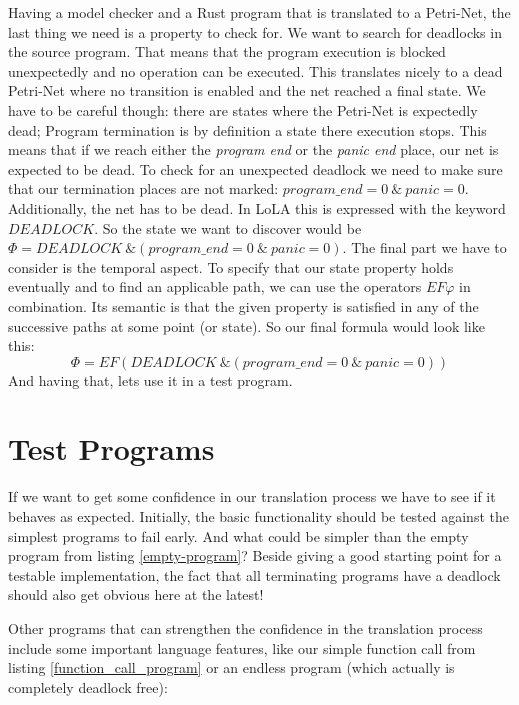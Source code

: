 Having a model checker and a Rust program that is translated to a Petri-Net, the last thing we need is a property to check for.
We want to search for deadlocks in the source program.
That means that the program execution is blocked unexpectedly and no operation can be executed.
This translates nicely to a dead Petri-Net where no transition is enabled and the net reached a final state.
We have to be careful though: there are states where the Petri-Net is expectedly dead;
Program termination is by definition a state there execution stops.
This means that if we reach either the \textit{program end} or the \textit{panic end} place, our net is expected to be dead.
To check for an unexpected deadlock we need to make sure that our termination places are not marked: $program\_end = 0\ \&\ panic = 0$.
Additionally, the net has to be dead.
In LoLA this is expressed with the keyword $DEADLOCK$.
So the state we want to discover would be $\Phi=DEADLOCK\ \& (program\_end = 0\ \&\ panic = 0)$.
The final part we have to consider is the temporal aspect.
To specify that our state property holds eventually and to find an applicable path, we can use the operators $EF\varphi$ in combination.
Its semantic is that the given property is satisfied in any of the successive paths at some point (or state).
So our final formula would look like this:
$$\Phi = EF(DEADLOCK\ \& (program\_end = 0\ \&\  panic = 0))$$
And having that, lets use it in a test program.

\section{Test Programs}
\label{app_test}
If we want to get some confidence in our translation process we have to see if it behaves as expected.
Initially, the basic functionality should be tested against the simplest programs to fail early.
And what could be simpler than the empty program from listing \ref{empty-program}?
Beside giving a good starting point for a testable implementation, the fact that all terminating programs have a deadlock should also get obvious here at the latest!

Other programs that can strengthen the confidence in the translation process include some important language features, like our simple function call from listing \ref{function_call_program} or an endless program (which actually is completely deadlock free):

